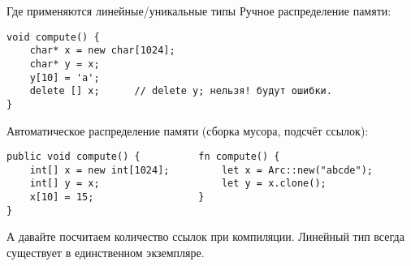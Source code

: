 \documentclass[aspectratio=169,dvipsnames,usenames]{beamer}
\begin{document}
\begin{frame}[fragile]{Где применяются линейные/уникальные типы}
Ручное распределение памяти:
\begin{verbatim}
void compute() {
    char* x = new char[1024];
    char* y = x;
    y[10] = 'a';
    delete [] x;      // delete y; нельзя! будут ошибки.
}
\end{verbatim}

Автоматическое распределение памяти (сборка мусора, подсчёт ссылок):
\begin{verbatim}
public void compute() {          fn compute() {
    int[] x = new int[1024];         let x = Arc::new("abcde");
    int[] y = x;                     let y = x.clone();
    x[10] = 15;                  }
}
\end{verbatim}

А давайте посчитаем количество ссылок при компиляции. Линейный тип всегда существует в единственном экземпляре.
\end{frame}
\end{document}
